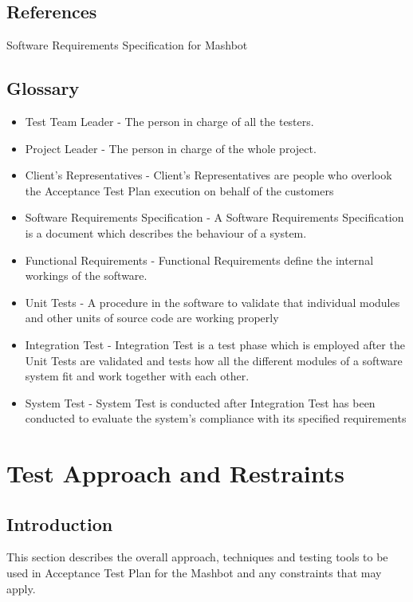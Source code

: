 \documentclass{article}
\begin{document}
\subsection{References}
Software Requirements Specification for Mashbot

\subsection{Glossary}

\begin{itemize}
\item Test Team Leader - The person in charge of all the testers.
\item Project Leader - The person in charge of the whole project.
\item Client’s Representatives - Client’s Representatives are people who overlook the Acceptance Test Plan
  execution on behalf of the customers
\item Software Requirements Specification - A Software Requirements Specification is a document which
  describes the behaviour of a system.
\item Functional Requirements - Functional Requirements define the internal workings of the software.
\item Unit Tests - A procedure in the software to validate that individual modules and other units of source
  code are working properly
\item Integration Test - Integration Test is a test phase which is employed after the Unit Tests are validated
  and tests how all the different modules of a software system fit and work together with each other.
\item System Test - System Test is conducted after Integration Test has been conducted to evaluate the
  system’s compliance with its specified requirements
\end{itemize}

\section{Test Approach and Restraints} %

\subsection{Introduction}

This section describes the overall approach, techniques and
testing tools to be used in Acceptance Test Plan for
the Mashbot and any constraints that may apply.
\end{document}

